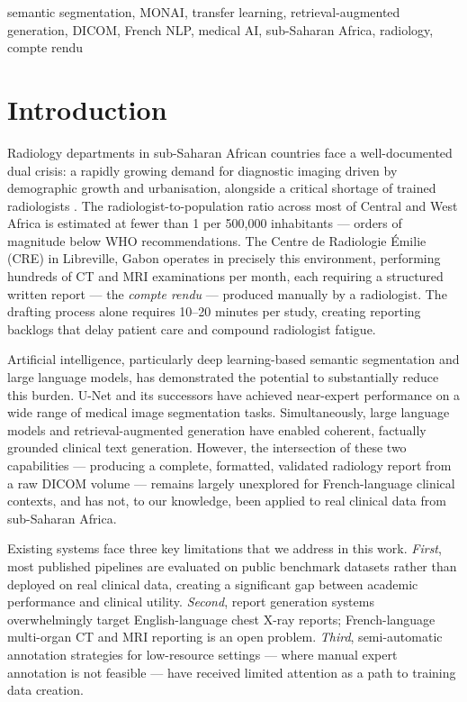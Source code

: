 \documentclass[conference]{IEEEtran}
\begin{document}
\begin{IEEEkeywords}
semantic segmentation, MONAI, transfer learning, retrieval-augmented generation,
DICOM, French NLP, medical AI, sub-Saharan Africa, radiology, compte rendu
\end{IEEEkeywords}

\section{Introduction}

Radiology departments in sub-Saharan African countries face a well-documented
dual crisis: a rapidly growing demand for diagnostic imaging driven by
demographic growth and urbanisation, alongside a critical shortage of trained
radiologists \cite{osei2019}. The radiologist-to-population ratio across most
of Central and West Africa is estimated at fewer than 1 per 500{,}000 inhabitants
--- orders of magnitude below WHO recommendations. The Centre de Radiologie
\'{E}milie (CRE) in Libreville, Gabon operates in precisely this environment,
performing hundreds of CT and MRI examinations per month, each requiring a
structured written report --- the \textit{compte rendu} --- produced manually
by a radiologist. The drafting process alone requires 10--20 minutes per study,
creating reporting backlogs that delay patient care and compound radiologist
fatigue.

Artificial intelligence, particularly deep learning-based semantic segmentation
and large language models, has demonstrated the potential to substantially
reduce this burden. U-Net \cite{ronneberger2015} and its successors have achieved
near-expert performance on a wide range of medical image segmentation tasks.
Simultaneously, large language models \cite{singhal2023} and retrieval-augmented
generation \cite{lewis2020} have enabled coherent, factually grounded clinical
text generation. However, the intersection of these two capabilities ---
producing a complete, formatted, validated radiology report from a raw DICOM
volume --- remains largely unexplored for French-language clinical contexts,
and has not, to our knowledge, been applied to real clinical data from
sub-Saharan Africa.

Existing systems face three key limitations that we address in this work.
\textit{First}, most published pipelines are evaluated on public benchmark
datasets rather than deployed on real clinical data, creating a significant
gap between academic performance and clinical utility. \textit{Second}, report
generation systems overwhelmingly target English-language chest X-ray reports;
French-language multi-organ CT and MRI reporting is an open problem.
\textit{Third}, semi-automatic annotation strategies for low-resource settings
--- where manual expert annotation is not feasible --- have received limited
attention as a path to training data creation.
\end{document}
